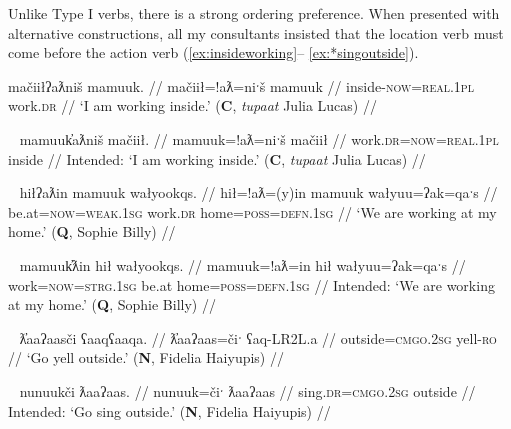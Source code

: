 Unlike Type I verbs, there is a strong ordering preference. When presented with alternative constructions, all my consultants insisted that the location verb must come before the action verb (\ref{ex:insideworking}-- \ref{ex:*singoutside}). 

\ex \label{ex:insideworking}
\begingl
\glpreamble mačiiłʔaƛniš mamuuk. //
\gla mačiił=!aƛ=niˑš mamuuk  //
\glb inside-\textsc{now}=\textsc{real.1pl} work.\textsc{dr} //
\glft `I am working inside.' (\textbf{C}, \textit{tupaat} Julia Lucas) //
\endgl
\xe

\ex~ \label{ex:*insideworking}
\begingl
\glpreamble *mamuuk̓aƛniš mačiił. //
\gla mamuuk=!aƛ=niˑš mačiił //
\glb work.\textsc{dr}=\textsc{now}=\textsc{real.1pl} inside //
\glft Intended: `I am working inside.' (\textbf{C}, \textit{tupaat} Julia Lucas) //
\endgl
\xe

\ex~ \label{ex:workathome}
\begingl
\glpreamble hiłʔaƛin mamuuk wałyookqs. //
\gla hił=!aƛ=(y)in mamuuk wałyuu=ʔak=qaˑs  //
\glb be.at=\textsc{now}=\textsc{weak.1sg} work.\textsc{dr} home=\textsc{poss}=\textsc{defn.1sg} //
\glft `We are working at my home.' (\textbf{Q}, Sophie Billy) //
\endgl
\xe

\ex~ \label{ex:*workathome}
\begingl
\glpreamble *mamuuk̓ƛin hił wałyookqs. //
\gla mamuuk=!aƛ=in hił wałyuu=ʔak=qaˑs  //
\glb work=\textsc{now}=\textsc{strg.1sg} be.at home=\textsc{poss}=\textsc{defn.1sg} //
\glft Intended: `We are working at my home.' (\textbf{Q}, Sophie Billy) //
\endgl
\xe

\ex~ \label{ex:shoutoutside}
\begingl
\glpreamble ƛ̓aaʔaasči ʕaaqʕaaqa. //
\gla ƛ̓aaʔaas=čiˑ ʕaq-LR2L.a  //
\glb outside=\textsc{cmgo.2sg} yell-\textsc{ro} //
\glft `Go yell outside.' (\textbf{N}, Fidelia Haiyupis) //
\endgl
\xe

\ex~ \label{ex:*singoutside}
\begingl
\glpreamble *nunuukči ƛaaʔaas. //
\gla nunuuk=čiˑ ƛaaʔaas  //
\glb sing.\textsc{dr}=\textsc{cmgo.2sg} outside //
\glft Intended: `Go sing outside.'\footnotemark{} (\textbf{N}, Fidelia Haiyupis) //
\endgl
\xe



